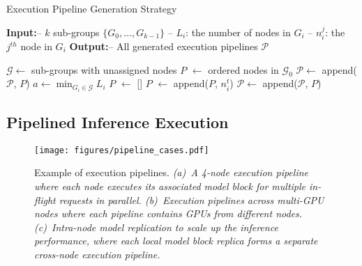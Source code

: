 \begin{algorithm}[h]
    \caption{Execution Pipeline Generation Strategy}
    \small
    \label{alg:pipeline_gen}
    \begin{algorithmic}[1]
    \Statex \textbf{Input:}\quad -- $k$ sub-groups $\{G_0, \dots, G_{k-1}\}$
    \Statex \quad -- $L_i$: the number of nodes in $G_i$
    \Statex \quad -- $n_i^j$: the $j^{th}$ node in $G_i$
    \Statex \textbf{Output:}\quad -- All generated execution pipelines $\mathcal{P}$

    \State $\mathcal{G} \gets$ sub-groups with unassigned nodes
         
            \State $P$ $\gets$ ordered nodes in $\mathcal{G}_0$
            \State $\mathcal{P} \gets$ append($\mathcal{P}$, $P$)
        \Else {}
            \State $a \gets \min_{G_i \in \mathcal{G}} L_i$     
                \State $P$ $\gets$ []
                    \State $P$ $\gets$ append($P$, $n_i^t$)
                \EndFor
               \State $\mathcal{P} \gets$ append($\mathcal{P}$, $P$)
            \EndFor
        \EndIf
    \EndWhile
\end{algorithmic}
\end{algorithm}

\vspace{-8pt} 

\subsection{Pipelined Inference Execution}

\begin{figure}
    \centering
    \texttt{[image: figures/pipeline\_cases.pdf]}
    \vspace{-15pt} 
    \caption{Example of execution pipelines. 
    \textit{\textmd{(a)~A 4-node execution pipeline where each node executes its associated model block for multiple in-flight requests in parallel. 
    (b)~Execution pipelines across multi-GPU nodes where each pipeline contains GPUs from different nodes.
    (c)~Intra-node model replication to scale up the inference performance, where each local model block replica forms a separate cross-node execution pipeline.}}
    }
    \label{fig:pipeline}
    \vspace{-1em}
\end{figure}


